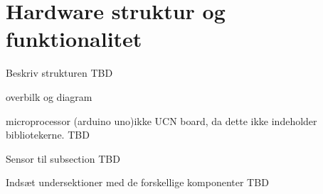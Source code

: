 \section{Hardware struktur og funktionalitet}
Beskriv strukturen TBD

\newline

overbilk og diagram

microprocessor (arduino uno)ikke UCN board, da dette ikke indeholder bibliotekerne. TBD

Sensor til subsection TBD



Indsæt undersektioner med de forskellige komponenter TBD
